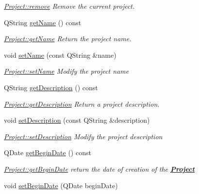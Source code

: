 \begin{DoxyCompactItemize}
\begin{DoxyCompactList}\small\item\em \hyperlink{classProject_a7bd735a59c2fdf2718db14c3073245fc}{Project\+::remove} Remove the current project. \end{DoxyCompactList}\item 
Q\+String \hyperlink{classProject_af547be6d3433bbf4ccf0f905788a9fee}{get\+Name} () const 
\begin{DoxyCompactList}\small\item\em \hyperlink{classProject_af547be6d3433bbf4ccf0f905788a9fee}{Project\+::get\+Name} Return the project name. \end{DoxyCompactList}\item 
void \hyperlink{classProject_ab330ed5176b1eb93b558676fff8c47e1}{set\+Name} (const Q\+String \&name)
\begin{DoxyCompactList}\small\item\em \hyperlink{classProject_ab330ed5176b1eb93b558676fff8c47e1}{Project\+::set\+Name} Modify the project {\itshape name} \end{DoxyCompactList}\item 
Q\+String \hyperlink{classProject_ae7cc47cfca8038bf63b67f0d255e92dd}{get\+Description} () const 
\begin{DoxyCompactList}\small\item\em \hyperlink{classProject_ae7cc47cfca8038bf63b67f0d255e92dd}{Project\+::get\+Description} Return a project description. \end{DoxyCompactList}\item 
void \hyperlink{classProject_a08632a8a8905245559c844c863fc796b}{set\+Description} (const Q\+String \&description)
\begin{DoxyCompactList}\small\item\em \hyperlink{classProject_a08632a8a8905245559c844c863fc796b}{Project\+::set\+Description} Modify the project {\itshape description} \end{DoxyCompactList}\item 
Q\+Date \hyperlink{classProject_a8cf94b4360d6f9d41ea503c6f06bcb0d}{get\+Begin\+Date} () const 
\begin{DoxyCompactList}\small\item\em \hyperlink{classProject_a8cf94b4360d6f9d41ea503c6f06bcb0d}{Project\+::get\+Begin\+Date} return the date of creation of the {\bfseries \hyperlink{classProject}{Project}} \end{DoxyCompactList}\item 
void \hyperlink{classProject_afd187147978c58351d686b987d37306e}{set\+Begin\+Date} (Q\+Date begin\+Date)

\end{DoxyCompactItemize}
